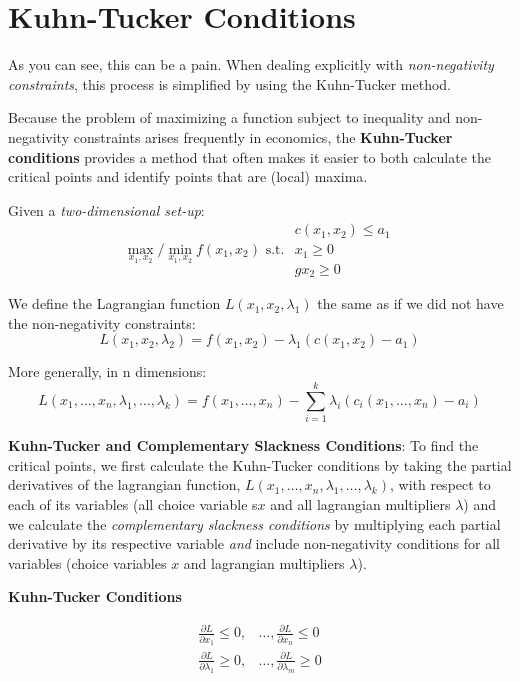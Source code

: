 \documentclass[]{book}
\theoremstyle{definition}
\theoremstyle{definition}
\theoremstyle{definition}
\theoremstyle{remark}
\begin{document}
\hypertarget{kuhn-tucker-conditions}{%
\section{Kuhn-Tucker Conditions}\label{kuhn-tucker-conditions}}

As you can see, this can be a pain. When dealing explicitly with \emph{non-negativity constraints}, this process is simplified by using the Kuhn-Tucker method.

Because the problem of maximizing a function subject to inequality and non-negativity constraints arises frequently in economics, the \textbf{Kuhn-Tucker conditions} provides a method that often makes it easier to both calculate the critical points and identify points that are (local) maxima.

Given a \emph{two-dimensional set-up}:
\[\max_{x_1,x_2}/\min_{x_1,x_2} f(x_1,x_2) \text{ s.t. }
\begin{array}{l}
c(x_1,x_2) \le a_1\\
x_1 \ge 0 \\
gx_2 \ge 0
\end{array}\]

We define the Lagrangian function \(L(x_1,x_2,\lambda_1)\) the same as if we did not have the non-negativity constraints:
\[L(x_1,x_2,\lambda_2) = f(x_1,x_2) - \lambda_1(c(x_1,x_2) - a_1)\]

More generally, in n dimensions:
\[ L(x_1, \dots, x_n, \lambda_1, \dots, \lambda_k) = f(x_1, \dots, x_n) - \sum_{i=1}^k\lambda_i(c_i(x_1,\dots, x_n) - a_i)\]

\textbf{Kuhn-Tucker and Complementary Slackness Conditions}: To find the critical points, we first calculate the Kuhn-Tucker conditions by taking the partial derivatives of the lagrangian function, \(L(x_1,\dots,x_n,\lambda_1,\dots,\lambda_k)\), with respect to each of its variables (all choice variable s\(x\) and all lagrangian multipliers \(\lambda\)) and we calculate the \emph{complementary slackness conditions} by multiplying each partial derivative by its respective variable \emph{and} include non-negativity conditions for all variables (choice variables \(x\) and lagrangian multipliers \(\lambda\)).

\textbf{Kuhn-Tucker Conditions}

\begin{align*}
\frac{\partial L}{\partial x_1} \leq 0, & \dots, \frac{\partial L}{\partial x_n} \leq 0\\
\frac{\partial L}{\partial \lambda_1} \geq 0, & \dots, \frac{\partial L}{\partial \lambda_m} \geq 0
\end{align*}
\end{document}
